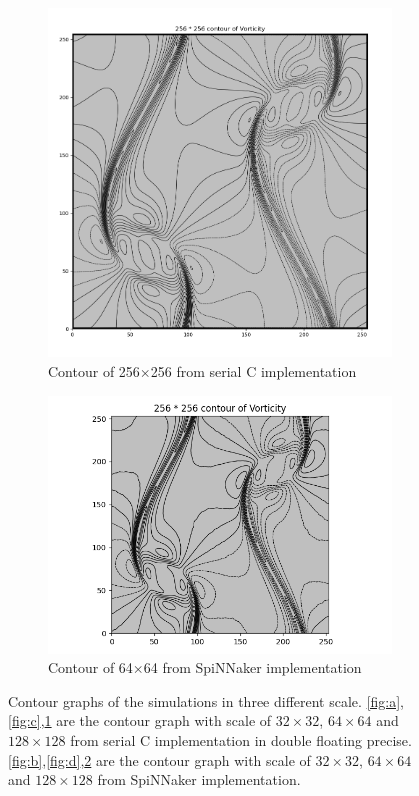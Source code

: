 \begin{figure}[htbp]
\medskip
\begin{subfigure}{0.43\textwidth}
\includegraphics[width=\linewidth]{figures/double_c_256.png}
\caption{Contour of 256$\times$256 from serial C implementation} \label{fig:e}
\end{subfigure}\hspace*{\fill}
\begin{subfigure}{0.57\textwidth}
\includegraphics[width=\linewidth]{figures/spinnaker_256.png}
\caption{Contour of 64$\times$64 from SpiNNaker implementation} \label{fig:f}
\end{subfigure}
\caption{Contour graphs of the simulations in three different scale. \ref{fig:a},\ref{fig:c},\ref{fig:e} are the contour graph with scale of $32\times32$, $64\times64$ and $128\times128$ from serial C implementation in double floating precise.\ref{fig:b},\ref{fig:d},\ref{fig:f} are the contour graph with scale of $32\times32$, $64\times64$ and $128\times128$ from SpiNNaker implementation.} 
\label{fig:contour}
\end{figure}

